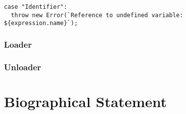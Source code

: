 \documentclass[12pt, oneside]{book}
\begin{document}
\begin{verbatim}
case "Identifier":
  throw new Error(`Reference to undefined variable: ${expression.name}`);
\end{verbatim}


\subsection{Loader}
\label{Step 0: Loader}


\subsection{Unloader}
\label{Step 0: Unloader}



\appendix

\backmatter




\chapter{Biographical Statement}

\end{document}
